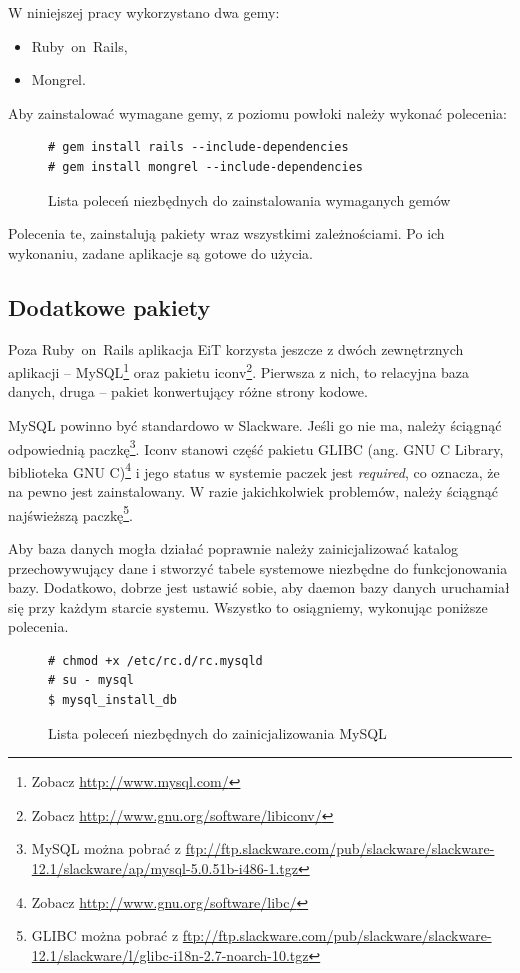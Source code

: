 \documentclass[a4paper,12pt,oneside]{report}
\begin{document}
W niniejszej pracy wykorzystano dwa gemy:
\begin{itemize}
  \item Ruby~on~Rails,
  \item Mongrel.
\end{itemize}

Aby zainstalować wymagane gemy, z poziomu powłoki należy wykonać polecenia:
\begin{figure}[h]
\begin{verbatim}# gem install rails --include-dependencies
# gem install mongrel --include-dependencies\end{verbatim}
\caption{Lista poleceń niezbędnych do zainstalowania wymaganych gemów\label{fig:gems}}
\end{figure}
Polecenia te, zainstalują pakiety wraz wszystkimi zależnościami. Po ich wykonaniu, zadane aplikacje są gotowe do użycia.

\subsection{Dodatkowe pakiety}
\label{sub:dodatkowe}
Poza Ruby~on~Rails aplikacja EiT korzysta jeszcze z dwóch zewnętrznych aplikacji -- MySQL\footnote{Zobacz \url{http://www.mysql.com/}} oraz pakietu iconv\footnote{Zobacz \url{http://www.gnu.org/software/libiconv/}}. Pierwsza z nich, to relacyjna baza danych, druga -- pakiet konwertujący różne strony kodowe.

MySQL powinno być standardowo w Slackware. Jeśli go nie ma, należy ściągnąć odpowiednią paczkę\footnote{MySQL można pobrać z \url{ftp://ftp.slackware.com/pub/slackware/slackware-12.1/slackware/ap/mysql-5.0.51b-i486-1.tgz}}. Iconv stanowi część pakietu GLIBC (ang. GNU C Library, biblioteka GNU C)\footnote{Zobacz \url{http://www.gnu.org/software/libc/}} i jego status w systemie paczek jest \emph{required}, co oznacza, że na pewno jest zainstalowany. W razie jakichkolwiek problemów, należy ściągnąć najświeższą paczkę\footnote{GLIBC można pobrać z \url{ftp://ftp.slackware.com/pub/slackware/slackware-12.1/slackware/l/glibc-i18n-2.7-noarch-10.tgz}}.

Aby baza danych mogła działać poprawnie należy zainicjalizować katalog przechowywujący dane i stworzyć tabele systemowe niezbędne do funkcjonowania bazy. Dodatkowo, dobrze jest ustawić sobie, aby daemon bazy danych uruchamiał się przy każdym starcie systemu. Wszystko to osiągniemy, wykonując poniższe polecenia.
\begin{figure}[h]
\begin{verbatim}# chmod +x /etc/rc.d/rc.mysqld
# su - mysql
$ mysql_install_db\end{verbatim}
\caption{Lista poleceń niezbędnych do zainicjalizowania MySQL\label{fig:mysql}}
\end{figure}
\end{document}

